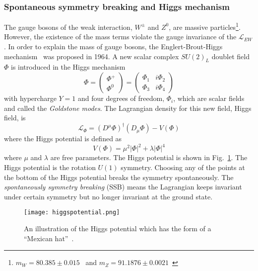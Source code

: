 \subsubsection{Spontaneous symmetry breaking and Higgs mechanism}
\label{subsubsec:sm_Higgs_mechanism}
The gauge bosons of the weak interaction, $W^{\pm}$ and $Z^{0}$, are massive particles\footnote{$m_{W}=80.385 \pm 0.015$~{\GeV} and $m_{Z}=91.1876 \pm 0.0021$~{\GeV}}.
However, the existence of the mass terms violate the gauge invariance of the $\mathcal{L}_{EW}$.
In order to explain the mass of gauge bosons, the Englert-Brout-Higgs mechanism~\cite{Higgs:1966ev, Higgs:1964pj, Higgs:1964ia, Englert:1964et, Guralnik:1964eu} was proposed in 1964.
A new scalar complex $SU(2)_{L}$ doublet field $\Phi$ is introduced in the Higgs mechanism
%
\begin{equation}
    \Phi = \left(\begin{matrix}\Phi^{+}\\\Phi^{0}\end{matrix}\right) = \left(\begin{matrix}\Phi_{1} & i\Phi_{2}\\\Phi_{3} & i\Phi_{4}\end{matrix}\right)
    \label{eq:sm_higgs_doublet}
\end{equation}
%
with hypercharge $Y = 1$ and four degrees of freedom, $\Phi_{i}$, which are scalar fields and called the \textit{Goldstone modes}.
The Lagrangian density for this new field, Higgs field, is
%
\begin{equation}
    \mathcal{L}_{\Phi} = (D^{\mu}\Phi)^{\dagger}(D_{\mu}\Phi) - V(\Phi)
    \label{eq:sm_higgs_lagrangian}
\end{equation}
%
where the Higgs potential is defined as
%
\begin{equation}
    V(\Phi) = \mu^{2}|\Phi|^{2} + \lambda|\Phi|^{4}
    \label{eq:sm_higgs_potential}
\end{equation}
%
where $\mu$ and $\lambda$ are free parameters.
The Higgs potential is shown in Fig.~\ref{fig:sm_higgs_potential}.
The Higgs potential is the rotation $U(1)$ symmetry.
Choosing any of the points at the bottom of the Higgs potential breaks the symmetry spontaneously.
The \textit{spontaneously symmetry breaking} (SSB) means the Lagrangian keeps invariant under certain symmetry but no longer invariant at the ground state.

\begin{figure}[htbp]
    \begin{center}
        \texttt{[image: higgspotential.png]}
        \caption{An illustration of the Higgs potential which has the form of a ``Mexican hat''~\cite{Ellis:2013jnq}.}
        \label{fig:sm_higgs_potential}
    \end{center}
\end{figure}

